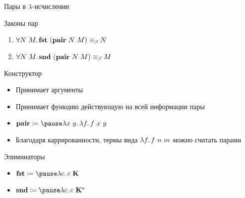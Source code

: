     \begin{frame}[fragile]{Пары в $\lambda$-исчислении}
        \begin{block}{Законы пар}
            \begin{enumerate}
                \item $\forall N~M\ldotp \mathbf{fst}~(\mathbf{pair}~N~M) \equiv_\beta N$
                \item $\forall N~M\ldotp \mathbf{snd}~(\mathbf{pair}~N~M) \equiv_\beta M$
            \end{enumerate}
        \end{block}
        \pause
        \begin{block}{Конструктор}
            \begin{itemize}
                \item Принимает аргументы
                \item Принимает функцию действующую на всей информации пары
                \item $\term{pair} \termdef \pause \lambda x~y\ldotp \lambda f \ldotp f \ap x \ap y$
                \item Благодаря каррированности, термы вида $\lambda f\ldotp f ~ n ~ m$ можно считать парами
            \end{itemize}
        \end{block}
        \pause
        \begin{block}{Элиминаторы}
            \begin{itemize}
                \item $\term{fst} \termdef \pause \lambda c \ldotp c \ap \term{K}$
                \item $\term{snd} \termdef \pause \lambda c \ldotp c \ap \term{K}^*$
            \end{itemize}
        \end{block}
    \end{frame}

